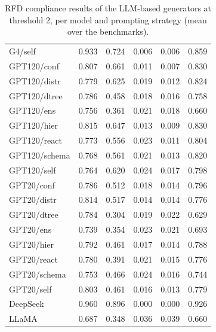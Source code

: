 \begin{table}[t]
\begin{tabular}{lrrrrr}
G4/self & 0.933 & 0.724 & 0.006 & 0.006 & 0.859 \\
GPT120/conf & 0.807 & 0.661 & 0.011 & 0.007 & 0.830 \\
GPT120/distr & 0.779 & 0.625 & 0.019 & 0.012 & 0.824 \\
GPT120/dtree & 0.786 & 0.458 & 0.018 & 0.016 & 0.758 \\
GPT120/ens & 0.756 & 0.361 & 0.021 & 0.018 & 0.660 \\
GPT120/hier & 0.815 & 0.647 & 0.013 & 0.009 & 0.830 \\
GPT120/react & 0.773 & 0.556 & 0.023 & 0.011 & 0.804 \\
GPT120/schema & 0.768 & 0.561 & 0.021 & 0.013 & 0.820 \\
GPT120/self & 0.764 & 0.620 & 0.024 & 0.017 & 0.798 \\
GPT20/conf & 0.786 & 0.512 & 0.018 & 0.014 & 0.796 \\
GPT20/distr & 0.814 & 0.517 & 0.014 & 0.014 & 0.776 \\
GPT20/dtree & 0.784 & 0.304 & 0.019 & 0.022 & 0.629 \\
GPT20/ens & 0.739 & 0.354 & 0.023 & 0.021 & 0.693 \\
GPT20/hier & 0.792 & 0.461 & 0.017 & 0.014 & 0.788 \\
GPT20/react & 0.780 & 0.391 & 0.021 & 0.015 & 0.776 \\
GPT20/schema & 0.753 & 0.466 & 0.024 & 0.016 & 0.744 \\
GPT20/self & 0.803 & 0.461 & 0.016 & 0.013 & 0.779 \\
\midrule
DeepSeek & 0.960 & 0.896 & 0.000 & 0.000 & 0.926 \\
LLaMA & 0.687 & 0.348 & 0.036 & 0.039 & 0.660 \\
\bottomrule
\end{tabular}
\caption{RFD compliance results of the LLM-based generators at threshold 2, per model and prompting strategy (mean over the benchmarks).}
\label{tab:rfdcompliance_llm_thr2}
\end{table}